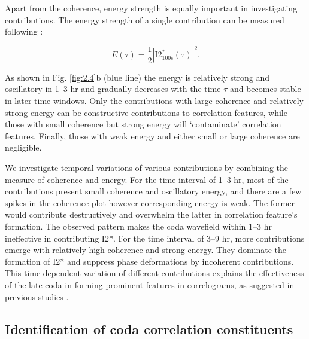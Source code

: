 Apart from the coherence, energy strength is equally important in investigating contributions. The energy strength of a single contribution can be measured following  \citet{sager_sensitivity_2018}:

\begin{equation}\label{eq:2.2}
    E(\tau) = \frac{1}{2}|\text{I2}^*_{100\text{s}}(\tau)|^2.
\end{equation}

As shown in Fig. \ref{fig:2.4}b (blue line) the energy is relatively strong and oscillatory in 1--3 hr and gradually decreases with the time $\tau$ and becomes stable in later time windows. Only the contributions with large coherence and relatively strong energy can be constructive contributions to correlation features, while those with small coherence but strong energy will `contaminate' correlation features. Finally, those with weak energy and either small or large coherence are negligible.





We investigate temporal variations of various contributions by combining the measure of coherence and energy. For the time interval of 1--3 hr, most of the contributions present small coherence and oscillatory energy, and there are a few spikes in the coherence plot however corresponding energy is weak. The former would contribute destructively and overwhelm the latter in correlation feature's formation. The observed pattern makes the coda wavefield within 1--3 hr ineffective in contributing I2*. For the time interval of 3--9 hr, more contributions emerge with relatively high coherence and strong energy. They dominate the formation of I2* and suppress phase deformations by incoherent contributions. This time-dependent variation of different contributions explains the effectiveness of the late coda in forming prominent features in correlograms, as suggested in previous studies \citep{lin_seismic_2013,poli_analysis_2017,kennett_evolution_2018}.




\subsection{Identification of coda correlation constituents}\label{subsec:theo_sc_iden}


